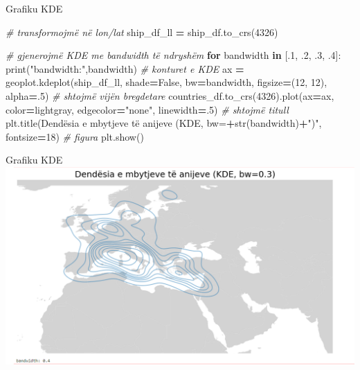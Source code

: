 \documentclass[
  ignorenonframetext,
]{beamer}
\newenvironment{Shaded}{\begin{snugshade}}{\end{snugshade}}
\newcommand{\BuiltInTok}[1]{#1}
\newcommand{\CommentTok}[1]{\textcolor[rgb]{0.56,0.35,0.01}{\textit{#1}}}
\newcommand{\ControlFlowTok}[1]{\textcolor[rgb]{0.13,0.29,0.53}{\textbf{#1}}}
\newcommand{\DecValTok}[1]{\textcolor[rgb]{0.00,0.00,0.81}{#1}}
\newcommand{\FloatTok}[1]{\textcolor[rgb]{0.00,0.00,0.81}{#1}}
\newcommand{\KeywordTok}[1]{\textcolor[rgb]{0.13,0.29,0.53}{\textbf{#1}}}
\newcommand{\NormalTok}[1]{#1}
\newcommand{\OperatorTok}[1]{\textcolor[rgb]{0.81,0.36,0.00}{\textbf{#1}}}
\newcommand{\StringTok}[1]{\textcolor[rgb]{0.31,0.60,0.02}{#1}}
\newcommand{\VariableTok}[1]{\textcolor[rgb]{0.00,0.00,0.00}{#1}}
\begin{document}
\begin{frame}[fragile]{Grafiku KDE}
\protect\hypertarget{grafiku-kde-2}{}

\begin{Shaded}
\begin{Highlighting}[]
\CommentTok{\# transformojmë në lon/lat}
\NormalTok{ship\_df\_ll }\OperatorTok{=}\NormalTok{ ship\_df.to\_crs(}\DecValTok{4326}\NormalTok{)}

\CommentTok{\# gjenerojmë KDE me bandwidth të ndryshëm}
\ControlFlowTok{for}\NormalTok{ bandwidth }\KeywordTok{in}\NormalTok{ [}\FloatTok{.1}\NormalTok{, }\FloatTok{.2}\NormalTok{, }\FloatTok{.3}\NormalTok{, }\FloatTok{.4}\NormalTok{]:}
    \BuiltInTok{print}\NormalTok{(}\StringTok{"bandwidth:"}\NormalTok{,bandwidth)}
    \CommentTok{\# konturet e KDE}
\NormalTok{    ax }\OperatorTok{=}\NormalTok{ geoplot.kdeplot(ship\_df\_ll, shade}\OperatorTok{=}\VariableTok{False}\NormalTok{, bw}\OperatorTok{=}\NormalTok{bandwidth, figsize}\OperatorTok{=}\NormalTok{(}\DecValTok{12}\NormalTok{, }\DecValTok{12}\NormalTok{), alpha}\OperatorTok{=}\FloatTok{.5}\NormalTok{)}
    \CommentTok{\# shtojmë vijën bregdetare}
\NormalTok{    countries\_df.to\_crs(}\DecValTok{4326}\NormalTok{).plot(ax}\OperatorTok{=}\NormalTok{ax, color}\OperatorTok{=}\StringTok{\textquotesingle{}lightgray\textquotesingle{}}\NormalTok{, edgecolor}\OperatorTok{=}\StringTok{"none"}\NormalTok{, linewidth}\OperatorTok{=}\FloatTok{.5}\NormalTok{)}
    \CommentTok{\# shtojmë titull}
\NormalTok{    plt.title(}\StringTok{\textquotesingle{}Dendësia e mbytjeve të anijeve (KDE, bw=\textquotesingle{}}\OperatorTok{+}\BuiltInTok{str}\NormalTok{(bandwidth)}\OperatorTok{+}\StringTok{")"}\NormalTok{, fontsize}\OperatorTok{=}\DecValTok{18}\NormalTok{)}
    \CommentTok{\# figura}
\NormalTok{    plt.show()}
\end{Highlighting}
\end{Shaded}
\end{frame}

\begin{frame}{Grafiku KDE}
\protect\hypertarget{grafiku-kde-3}{}
\includegraphics{./Figs/kde.png}
\end{frame}
\end{document}
